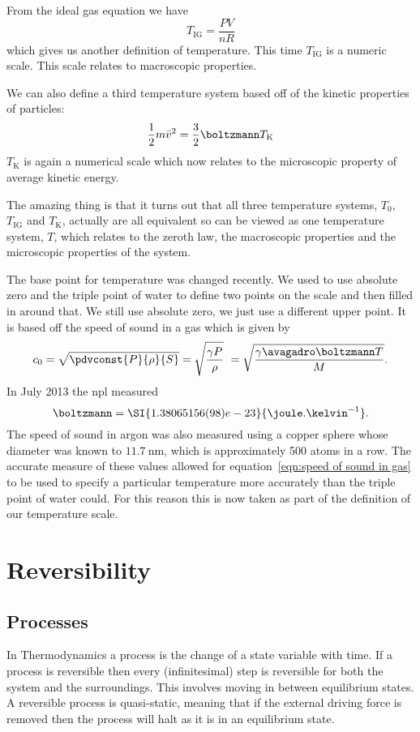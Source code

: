     From the ideal gas equation we have
    \[T_\mathrm{IG} = \frac{PV}{nR}\]
    which gives us another definition of temperature.
    This time \(T_\mathrm{IG}\) is a numeric scale.
    This scale relates to macroscopic properties.
    
    We can also define a third temperature system based off of the kinetic properties of particles:
    \[\frac{1}{2}m\bar{v}^2 = \frac{3}{2}\boltzmann T_\mathrm{K}\]
    \(T_\mathrm{K}\) is again a numerical scale which now relates to the microscopic property of average kinetic energy.
    
    The amazing thing is that it turns out that all three temperature systems, \(T_0\), \(T_\mathrm{IG}\) and \(T_\mathrm{K}\), actually are all equivalent so can be viewed as one temperature system, \(T\), which relates to the zeroth law, the macroscopic properties and the microscopic properties of the system.
    
    The base point for temperature was changed recently.
    We used to use absolute zero and the triple point of water to define two points on the scale and then filled in around that.
    We still use absolute zero, we just use a different upper point.
    It is based off the speed of sound in a gas which is given by
    \begin{equation}\label{eqn:speed of sound in gas}
        c_0 = \sqrt{\pdvconst{P}{\rho}{S}} = \sqrt{\frac{\gamma P}{\rho}}\ = \sqrt{\frac{\gamma\avagadro\boltzmann T}{M}}.
    \end{equation}
    In July 2013 the \acrfull{npl} measured
    \[\boltzmann = \SI{1.38065156(98)e-23}{\joule.\kelvin^{-1}}.\]
    The speed of sound in argon was also measured using a copper sphere whose diameter was known to \(\SI{11.7}{\nano\metre}\), which is approximately 500 atoms in a row.
    The accurate measure of these values allowed for equation~\ref{eqn:speed of sound in gas} to be used to specify a particular temperature more accurately than the triple point of water could.
    For this reason this is now taken as part of the definition of our temperature scale.
    
    \section{Reversibility}
    \subsection{Processes}
    In Thermodynamics a process is the change of a state variable with time.
    If a process is reversible then every (infinitesimal) step is reversible for both the system and the surroundings.
    This involves moving in between equilibrium states.
    A reversible process is quasi-static, meaning that if the external driving force is removed then the process will halt as it is in an equilibrium state.
    
